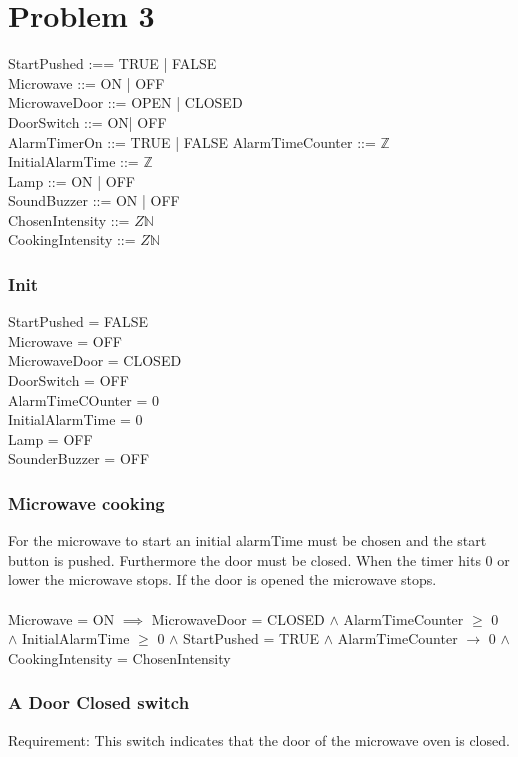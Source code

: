 


\chapter{Problem 3}

StartPushed :== TRUE | FALSE \\
Microwave ::= ON | OFF  \\
MicrowaveDoor ::= OPEN | CLOSED \\
DoorSwitch ::= ON| OFF \\
AlarmTimerOn ::= TRUE | FALSE
AlarmTimeCounter ::= $\mathbb{Z}$ \\
InitialAlarmTime ::= $\mathbb{Z}$ \\
Lamp ::= ON | OFF \\
SoundBuzzer ::= ON | OFF \\
ChosenIntensity ::= $Z\mathbb{N}$ \\
CookingIntensity ::= $Z\mathbb{N}$ \\

\subsection{Init}

StartPushed = FALSE \\
Microwave = OFF \\
MicrowaveDoor = CLOSED \\
DoorSwitch = OFF \\
AlarmTimeCOunter = 0 \\
InitialAlarmTime = 0 \\
Lamp = OFF \\
SounderBuzzer = OFF \\

\subsection{Microwave cooking}
For the microwave to start an initial alarmTime must be chosen and the start button is pushed. Furthermore the door must be closed. When the timer hits 0 or lower the microwave stops. If the door is opened the microwave stops. \\
\\
Microwave = ON $\implies$ MicrowaveDoor = CLOSED $\wedge$ AlarmTimeCounter $\geq$ 0 $\wedge$ InitialAlarmTime $\geq$ 0  $\wedge$ StartPushed = TRUE $\wedge$ AlarmTimeCounter $\rightarrow$ 0 $\wedge$ CookingIntensity = ChosenIntensity


\subsection{A Door Closed switch}
Requirement: This switch indicates that the door of the microwave oven is  closed.

